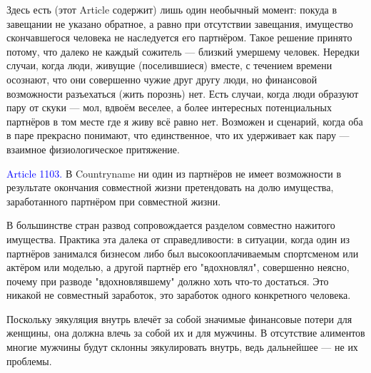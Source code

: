 \documentclass[11pt]{article}
\theoremstyle{remark}
\theoremstyle{definition}
\begin{document}
\color{blue}

Здесь есть (этот Article содержит) лишь один необычный момент: покуда в завещании не указано обратное, а равно при отсутствии завещания, имущество скончавшегося человека не наследуется его партнёром. Такое решение принято потому, что далеко не каждый сожитель --- близкий умершему человек. Нередки случаи, когда люди, живущие (поселившиеся) вместе, с течением времени осознают, что они совершенно чужие друг другу люди, но финансовой возможности разъехаться (жить порознь) нет. Есть случаи, когда люди образуют пару от скуки --- мол, вдвоём веселее, а более интересных потенциальных партнёров в том месте где я живу всё равно нет. Возможен и сценарий, когда оба в паре прекрасно понимают, что единственное, что их удерживает как пару --- взаимное физиологическое притяжение.









\color{black}

\textcolor{blue}{Article 1103.} В Countryname ни один из партнёров не имеет возможности в результате окончания совместной жизни претендовать на долю имущества, заработанного партнёром при совместной жизни.




\color{blue}



В большинстве стран развод сопровождается разделом совместно нажитого имущества. Практика эта далека от справедливости: в ситуации, когда один из партнёров занимался бизнесом либо был высокооплачиваемым спортсменом или актёром или моделью, а другой партнёр его "вдохновлял", совершенно неясно, почему при разводе "вдохновлявшему" должно хоть что-то достаться. Это никакой не совместный заработок, это заработок одного конкретного человека. 


Поскольку эякуляция внутрь влечёт за собой значимые финансовые потери для женщины, она должна влечь за собой их и для мужчины. В отсутствие алиментов многие мужчины будут склонны эякулировать внутрь, ведь дальнейшее --- не их проблемы.
\end{document}
